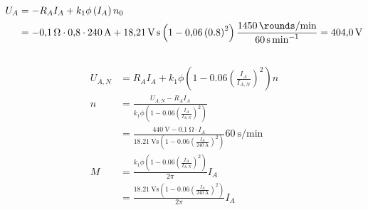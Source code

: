 \documentclass[11pt,a4paper]{scrartcl}
\newcommand{\mybr}[1]{\left(#1\right)}
\newcommand{\0}{_{\mybr{0}}}
\newcommand{\1}{_{\mybr{1}}}
\newcommand{\2}{_{\mybr{2}}}
\begin{document}
\subsection{}
\begin{align}
U_A&=-R_A I_A+k_1\phi\mybr{I_A}n_0\\
&=\SI{-0.1}{\ohm}\cdot\num{0.8}\cdot\SI{240}{\ampere}+\SI{18.21}{\volt\second}\mybr{1-\num{0.06}\mybr{0.8}^2}\frac{\SI{1450}{\rounds\per\minute}}{\SI{60}{\second\per\minute}}=\SI{404.0}{\volt}
\end{align}

\subsection{}
\begin{align}
U_{A,N}&=R_A I_A+k_1\phi\mybr{1-\num{0.06}\mybr{\frac{I_A}{I_{A,N}}}^2}n\\
n&=\frac{U_{A,N}-R_A I_A}{k_1\phi\mybr{1-\num{0.06}\mybr{\frac{I_A}{I_{A,N}}}^2}}\\
&=\frac{\SI{440}{\volt}-\SI{0.1}{\ohm}\cdot I_A}{\SI{18.21}{\volt\second}\mybr{1-\num{0.06}\mybr{\frac{I_A}{\SI{240}{\ampere}}}^2}}\SI{60}{\second\per\minute}\\
M&=\frac{k_1\phi\mybr{1-\num{0.06}\mybr{\frac{I_A}{I_{A,N}}}^2}}{2\pi}I_A\\
&=\frac{\SI{18.21}{\volt\second}\mybr{1-\num{0.06}\mybr{\frac{I_A}{\SI{240}{\ampere}}}^2}}{2\pi}I_A
\end{align}
\begin{figure*}[!hp]
	\centering
\end{figure*}
\end{document}
